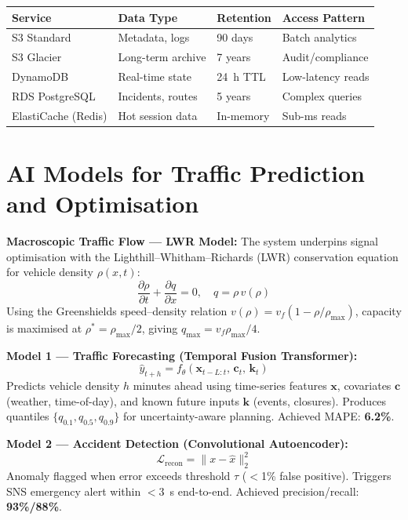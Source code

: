 \documentclass[11pt,a4paper]{article}
\begin{document}
\renewcommand{\arraystretch}{1.2}
\begin{center}
\begin{tabular}{|L{2.8cm}|L{2.8cm}|L{2cm}|L{3.2cm}|}
\hline
\textbf{Service} & \textbf{Data Type} & \textbf{Retention} & \textbf{Access Pattern} \\
\hline
S3 Standard & Metadata, logs & 90 days & Batch analytics \\
\hline
S3 Glacier & Long-term archive & 7 years & Audit/compliance \\
\hline
DynamoDB & Real-time state & 24~h TTL & Low-latency reads \\
\hline
RDS PostgreSQL & Incidents, routes & 5 years & Complex queries \\
\hline
ElastiCache (Redis) & Hot session data & In-memory & Sub-ms reads \\
\hline
\end{tabular}
\end{center}

\section{AI Models for Traffic Prediction and Optimisation}

\noindent\textbf{Macroscopic Traffic Flow — LWR Model:}
The system underpins signal optimisation with the Lighthill--Whitham--Richards (LWR) conservation equation for vehicle density $\rho(x,t)$:
\[
  \frac{\partial \rho}{\partial t} + \frac{\partial q}{\partial x} = 0, \quad q = \rho\,v(\rho)
\]
Using the Greenshields speed--density relation $v(\rho)=v_f(1-\rho/\rho_{\max})$, capacity is maximised at $\rho^*=\rho_{\max}/2$, giving $q_{\max}=v_f\rho_{\max}/4$.

\vspace{3pt}
\noindent\textbf{Model 1 — Traffic Forecasting (Temporal Fusion Transformer):}
\[
  \hat{y}_{t+h} = f_\theta(\mathbf{x}_{t-L:t},\,\mathbf{c}_t,\,\mathbf{k}_t)
\]
Predicts vehicle density $h$ minutes ahead using time-series features $\mathbf{x}$, covariates $\mathbf{c}$ (weather, time-of-day), and known future inputs $\mathbf{k}$ (events, closures). Produces quantiles $\{q_{0.1}, q_{0.5}, q_{0.9}\}$ for uncertainty-aware planning. Achieved MAPE: \textbf{6.2\%}.

\vspace{3pt}
\noindent\textbf{Model 2 — Accident Detection (Convolutional Autoencoder):}
\[
  \mathcal{L}_{\text{recon}} = \|x - \hat{x}\|_2^2
\]
Anomaly flagged when error exceeds threshold $\tau$ ($<$1\% false positive). Triggers SNS emergency alert within $<$3~s end-to-end. Achieved precision/recall: \textbf{93\%/88\%}.
\end{document}
